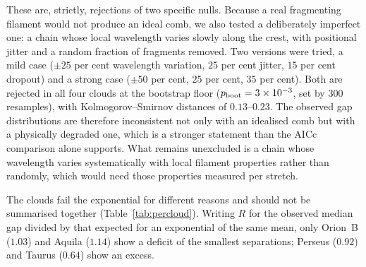 \documentclass[usenatbib,twoside,twocolumn]{mnras}
\begin{document}
These are, strictly, rejections of two specific nulls. Because a real fragmenting filament would not produce an ideal comb, we also tested a deliberately imperfect one: a chain whose local wavelength varies slowly along the crest, with positional jitter and a random fraction of fragments removed. Two versions were tried, a mild case ($\pm25$ per cent wavelength variation, $25$ per cent jitter, $15$ per cent dropout) and a strong case ($\pm50$ per cent, $25$ per cent, $35$ per cent). Both are rejected in all four clouds at the bootstrap floor ($p_{\rm boot}=3\times10^{-3}$, set by $300$ resamples), with Kolmogorov--Smirnov distances of $0.13$--$0.23$. The observed gap distributions are therefore inconsistent not only with an idealised comb but with a physically degraded one, which is a stronger statement than the AICc comparison alone supports. What remains unexcluded is a chain whose wavelength varies systematically with local filament properties rather than randomly, which would need those properties measured per stretch.

The clouds fail the exponential for different reasons and should not be summarised together (Table~\ref{tab:percloud}). Writing $R$ for the observed median gap divided by that expected for an exponential of the same mean, only Orion~B ($1.03$) and Aquila ($1.14$) show a deficit of the smallest separations; Perseus ($0.92$) and Taurus ($0.64$) show an excess.
\end{document}
